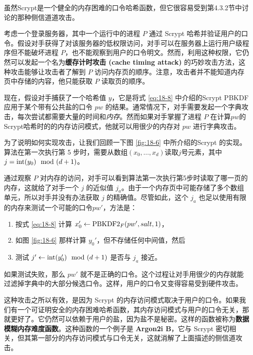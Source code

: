 虽然Scrypt是一个健全的内存困难的口令哈希函数，但它很容易受到第4.3.2节中讨论的那种侧信道道攻击。

考虑一个登录服务器，其中一个运行中的进程 $P$ 通过 Scrypt 哈希并验证用户的口令。假设对手获得了对该服务器的低权限访问，对手可以在服务器上运行用户级程序但不能破坏进程 $P$，也不能观察到用户的口令明文。然而，利用这种权限，它仍然可以发起一个名为\textbf{缓存计时攻击 (cache timing attack)} 的巧妙攻击方法，这种攻击能够让攻击者了解到 $P$ 访问内存页的顺序。注意，攻击者并不能知道内存页中存储的内容，他只能获取 $P$ 读取页的顺序。

现在，假设对手捕获了一个哈希值 $y$，它是将式 \ref{eq:18-8} 中介绍的Scrypt PBKDF应用于某个带有公共盐的口令 $pw$ 的结果。通常情况下，对手需要发起一个字典攻击，每次尝试都需要大量的时间和\emph{内存}。然而如果对手掌握了进程 $P$ 在计算$pw$的Scrypt哈希时的的内存访问模式，他就可以用很少的内存对 $pw$ 进行字典攻击。

为了说明如何实现攻击，让我们回顾一下图 \ref{fig:18-6} 中所介绍的Scrypt 的实现。算法在第一次执行第 5 步时，需要从数组$(x_0,\dots,x_d)$读取$j$号元素，其中$j={\rm int}(y_0)\mod(d+1)$。

通过观察 $P$ 对内存的访问，对手可以看到算法第一次执行第5步时读取了哪一页的内存，这就给了对手一个 $j$ 的近似值 $j_a$。由于一个内存页中可能存储了多个数组单元，所以对手并没有办法获取 $j$ 的精确值。尽管如此，这个 $j_a$ 也足以使用有限的内存来测试一个可能的口令$pw'$，方法是：
\begin{enumerate}
	\item 按式 \ref{eq:18-8} 计算 $x_0'\leftarrow{\rm PBKDF2}_F(pw',salt,1)$，
	\item 如图 \ref{fig:18-6} 那样计算 $y_0'$，但不存储任何中间值，然后
	\item 测试 $j'\leftarrow{\rm int}(y_0')\mod(d+1)$ 是否与 $j_a$ 接近。
\end{enumerate}

如果测试失败，那么 $pw'$ 就不是正确的口令。这个过程让对手用很少的内存就能过滤掉字典中的大部分候选口令。这样，用户的口令又变得容易受到硬件攻击。

\begin{snote}[一个解决方案.]
这种攻击之所以有效，是因为 Scrypt 的内存访问模式取决于用户的口令。如果我们有一个可证明安全的内存困难哈希函数，其内存访问模式与用户的口令无关，那就更好了。它仍然可以依赖于用户的盐，因为盐不是秘密。这样的函数被称为\textbf{数据模糊内存难度函数}。这种函数的一个例子是 \textbf{Argon2i B}，它与 Scrypt 密切相关，但其第一部分的内存访问模式与口令无关，这就消解了上面描述的侧信道攻击。
\end{snote}

